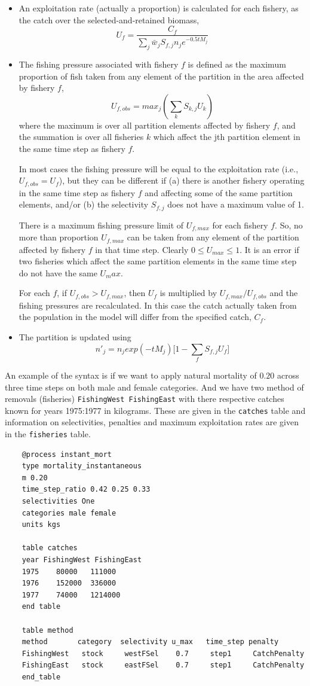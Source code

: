 \begin{itemize}
	\item An exploitation rate (actually a proportion) is calculated for each fishery, as the catch over the selected-and-retained biomass,
	$$ U_f = \frac{C_f}{\sum_j \bar{w}_jS_{f,j}n_j e^{-0.5tM_j}}$$
	\item The fishing pressure associated with fishery $f$ is defined as the maximum proportion of fish taken from any element of the partition in the area affected by fishery $f$,
	$$ U_{f,obs} = max_j(\sum_k S_{k,j}U_k) $$
	where the maximum is over all partition elements affected by fishery $f$, and the summation is over all fisheries $k$ which affect the jth partition element in the same time step as fishery $f$.
	
In most cases the fishing pressure will be equal to the exploitation rate (i.e., $U_{f,obs} = U_f$), but they can be different if (a) there is another fishery operating in the same time step as fishery $f$ and affecting some of the same partition elements, and/or (b) the selectivity $S_{f,j}$ does not have a maximum value of 1.
	
There is a maximum fishing pressure limit of $U_{f,max}$ for each fishery $f$. So, no more than proportion $U_{f,max}$ can be taken from any element of the partition affected by fishery $f$ in that time step. Clearly $0 \leq U_{max} \leq 1$. It is an error if two fisheries which affect the same partition elements in the same time step do not have the same $U_max$.

For each $f$, if $U_{f,obs} > U_{f,max}$, then $U_f$ is multiplied by $U_{f,max}/U_{f,obs}$ and the fishing pressures are recalculated. In this case the catch actually taken from the population in the model will differ from the specified catch, $C_f$.
	
\item The partition is updated using
	$$ n'_j = n_j exp(-tM_j)\big[1 - \sum_f S_{f,j} U_f \big] $$ 
\end{itemize}

An example of the syntax is if we want to apply natural mortality of $0.20$ across three time steps on both male and female categories. And we have two method of removals (fisheries) \texttt{FishingWest FishingEast} with there respective catches known for years 1975:1977 in kilograms. These are given in the \texttt{catches} table and information on selectivities, penalties and maximum exploitation rates are given in the \texttt{fisheries} table.

{\small{\begin{verbatim}
	@process instant_mort
	type mortality_instantaneous
	m 0.20
	time_step_ratio 0.42 0.25 0.33
	selectivities One
	categories male female
	units kgs

	table catches
	year FishingWest FishingEast
	1975	80000	111000
	1976	152000	336000
	1977	74000	1214000
	end table

	table method
	method       category  selectivity u_max   time_step penalty
	FishingWest   stock     westFSel    0.7     step1     CatchPenalty
	FishingEast   stock     eastFSel    0.7     step1     CatchPenalty
	end_table
	\end{verbatim}}}

